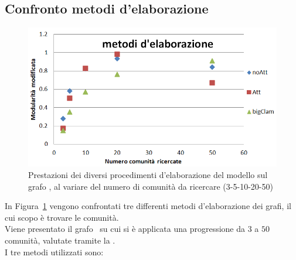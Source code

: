 
%
\subsection{Confronto metodi d'elaborazione}%
%
\begin{figure}[htp]
	\centering
	\includegraphics[width=\linewidth]{immagini/MOD_3_elaborazione}
	\caption{Prestazioni dei diversi procedimenti d'elaborazione del modello sul grafo \cora, al variare del numero di comunità da ricercare (3-5-10-20-50)}
	\label{fig:MOD_3_elaborazione}
\end{figure}
%
In Figura~\ref{fig:MOD_3_elaborazione} vengono confrontati tre differenti metodi d'elaborazione dei grafi, il cui scopo è trovare le comunità.\\
Viene presentato il grafo \cora\ su cui si è applicata una progressione da $3$ a $50$ comunità, valutate tramite la \mmod. \\
I tre metodi utilizzati sono:
